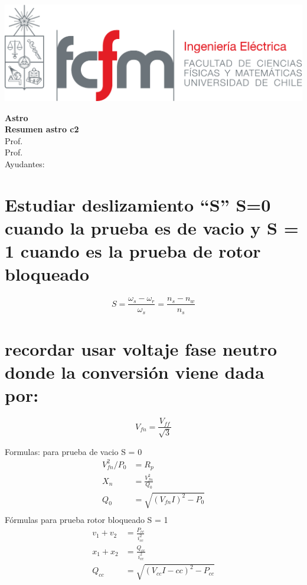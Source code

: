 \documentclass[
  11pt,
  letterpaper,
  answers
]{exam}
\begin{document}
\begin{minipage}{0.42\textwidth}
    \includegraphics[width=\textwidth]{../fcfm_die}
\end{minipage}
\begin{minipage}{0.53\textwidth}
\begin{center} 
\large\textbf{Astro}  \\
\large\textbf{Resumen astro c2} \\
\normalsize Prof.~\\
\normalsize Prof.~\\
\normalsize Ayudantes: 
\end{center}
\end{minipage}

\vspace{0.5cm}
\noindent
\vspace{.85cm}




\begin{parts}
    \part{Estudiar deslizamiento ``S''  S=0 cuando la prueba es de vacio y S = 1 cuando es la prueba de rotor bloqueado}
    \begin{equation}
        S = \frac{\omega_s - \omega_r}{\omega_s} = \frac{n_s - n_w}{n_s}
    \end{equation}
    \part{recordar usar voltaje fase neutro donde la conversión viene dada por:}
\end{parts}

\begin{equation}
    V_{fn} = \frac{V_{ff}}{\sqrt{3}}
\end{equation}

Formulas: para prueba de vacio S = 0
\begin{align}
    V_{fn}^2/P_{0} &= R_{p} \\
    X_{n} &= \frac{V_{fn}^2}{Q_{0}}\\
    Q_0 &= \sqrt{(V_{fn}I)^2 - P_0}\\
\end{align}
Fórmulas para prueba rotor bloqueado S = 1
\begin{align}
    v_1 + v_2 &= \frac{P_{cc}}{i_{cc}^2}\\
    x_1 + x_2 &= \frac{Q_{cc}}{i_{cc}^2}\\
    Q_{cc} &= \sqrt{(V_{cc}I-{cc})^2 - P_{cc}}\\
\end{align}
\end{document}
